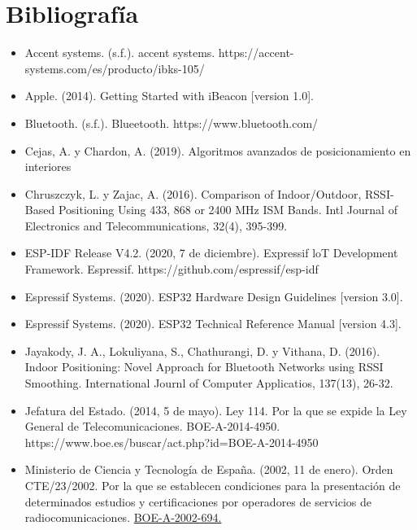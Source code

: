 \documentclass[paper=a4, fontsize=11pt,twoside]{scrartcl}	%
\begin{document}
\section{Bibliografía}
    \begin{itemize}
        \item Accent systems. (s.f.). accent systems. https://accent-systems.com/es/producto/ibks-105/ 
        \item Apple. (2014). Getting Started with iBeacon [version 1.0].
        \item Bluetooth. (s.f.). Blueetooth. https://www.bluetooth.com/ 
        \item Cejas, A. y Chardon, A. (2019). Algoritmos avanzados de posicionamiento en interiores
        \item Chruszczyk, L. y Zajac, A. (2016). Comparison of Indoor/Outdoor, RSSI-Based Positioning Using 433, 868 or 2400 MHz ISM Bands. Intl Journal of Electronics and Telecommunications, 32(4), 395-399.
        \item ESP-IDF Release V4.2. (2020, 7 de diciembre). Expressif loT Development Framework. Espressif. https://github.com/espressif/esp-idf 
        \item Espressif Systems. (2020). ESP32 Hardware Design Guidelines [version 3.0].
        \item Espressif Systems. (2020). ESP32 Technical Reference Manual [version 4.3].
        \item Jayakody, J. A., Lokuliyana, S., Chathurangi, D. y Vithana, D. (2016). Indoor Positioning:
         Novel Approach for Bluetooth Networks using RSSI Smoothing. International Journl of Computer Applicatios, 137(13), 26-32.
        \item Jefatura del Estado. (2014, 5 de mayo). Ley 114. Por la que se expide la Ley General de
        Telecomunicaciones. BOE-A-2014-4950. https://www.boe.es/buscar/act.php?id=BOE-A-2014-4950 
        \item Ministerio de Ciencia y Tecnología de España. (2002, 11 de enero). Orden CTE/23/2002. Por la que se establecen condiciones para la presentación de determinados estudios y certificaciones por
        operadores de servicios de radiocomunicaciones.  \href{https://www.boe.es/diario_boe/txt.php?id=BOE-A-2002-694}{BOE-A-2002-694.}
        

\end{itemize}
\end{document}
